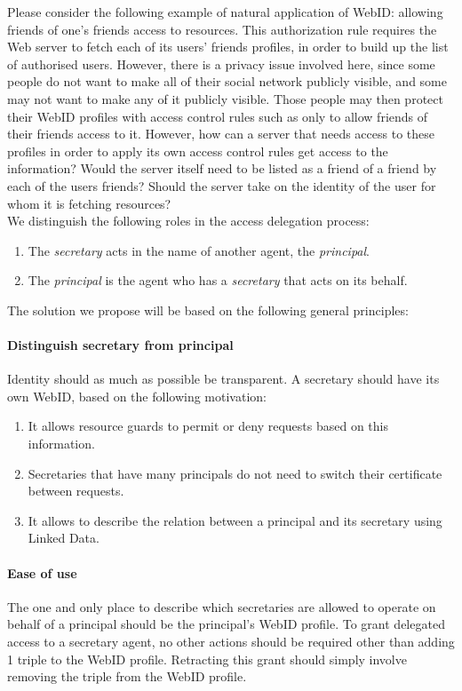 Please consider the following example of natural application of WebID: allowing friends of one's friends access to resources. This authorization rule requires the Web server to fetch each of its users' friends profiles, in order to build up the list of authorised users. However, there is a privacy issue involved here, since some people do not want to make all of their social network publicly visible, and some may not want to make any of it publicly visible. Those people may then protect their WebID profiles with access control rules such as only to allow friends of their friends access to it. However, how can a server that needs access to these profiles in order to apply its own access control rules get access to the information? Would the server itself need to be listed as a friend of a friend by each of the users friends? Should the server take on the identity of the user for whom it is fetching resources?\\

We distinguish the following roles in the access delegation process:
\begin{enumerate}
\item The \textit{secretary} acts in the name of another agent, the \textit{principal}.
\item The \textit{principal} is the agent who has a \textit{secretary} that acts on its behalf.
\end{enumerate}

The solution we propose will be based on the following general principles:

\paragraph{Distinguish secretary from principal} Identity should as much as possible be transparent. A secretary should have its own WebID, based on the following motivation:
\begin{enumerate}
\item It allows resource guards to permit or deny requests based on this information.
\item Secretaries that have many principals do not need to switch their certificate between requests.
\item It allows to describe the relation between a principal and its secretary using Linked Data.
\end{enumerate}

\paragraph{Ease of use} The one and only place to describe which secretaries are allowed to operate on behalf of a principal should be the principal's WebID profile. To grant delegated access to a secretary agent, no other actions should be required other than adding 1 triple to the WebID profile. Retracting this grant should simply involve removing the triple from the WebID profile.

